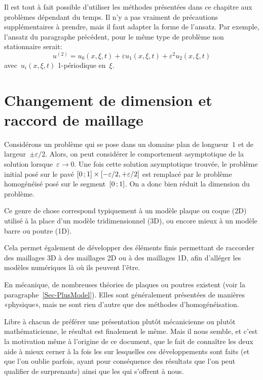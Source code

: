 Il est tout à fait possible d'utiliser les méthodes présentées dans ce chapitre aux problèmes dépendant du temps. Il n'y a pas vraiment de précautions supplémentaires à prendre, mais il faut adapter la forme de l'ansatz. Par exemple, l'ansatz du paragraphe précédent, pour le même type de problème non stationnaire serait:
\begin{equation}u^{(2)} = u_0(x,\xi,t)+\varepsilon u_1(x,\xi,t) + \varepsilon^2 u_2(x,\xi,t)\end{equation}
avec~$u_i(x,\xi,t)$ 1-périodique en~$\xi$.

\medskip
\section{Changement de dimension et raccord de maillage}


\medskip
Considérons un problème qui se pose dans un domaine plan de longueur~$1$ et de largeur~$\pm\varepsilon/2$. Alors, on peut considérer le comportement asymptotique de la solution lorsque~$\varepsilon \longrightarrow 0$. Une fois cette solution asymptotique trouvée, le problème initial posé sur le pavé $\mathopen{[}0\,;1\mathclose{]}\times[-\varepsilon/2,+\varepsilon/2]$ est remplacé par le problème homogénéisé posé sur le segment~$\mathopen{[}0\,;1\mathclose{]}$. On a donc bien réduit la dimension du problème.

\medskip
Ce genre de chose correspond typiquement à un modèle plaque ou coque (2D) utilisé à la place d'un modèle tridimensionnel (3D), ou encore mieux à un modèle barre ou poutre (1D).

Cela permet également de développer des éléments finis permettant de raccorder des maillages 3D à des maillages 2D ou à des maillages 1D, afin d'alléger les modèles numériques là où ils peuvent l'être.

\medskip
En mécanique, de nombreuses théories de plaques ou poutres existent (voir la paragraphe~\ref{Sec-PlusModel}). Elles sont généralement présentées de manières «physique», mais ne sont rien d'autre que des méthodes d'homogénéisation.

Libre à chacun de préférer une présentation plutôt mécanicienne ou plutôt mathématicienne, le résultat est finalement le même. Mais il nous semble, et c'est la motivation même à l'origine de ce document, que le fait de connaître les deux aide à mieux cerner à la fois les  sur lesquelles ces développements sont faits (et que l'on oublie parfois, ayant pour conséquence des résultats que l'on peut qualifier de surprenants) ainsi que les  qui s'offrent à nous. 

